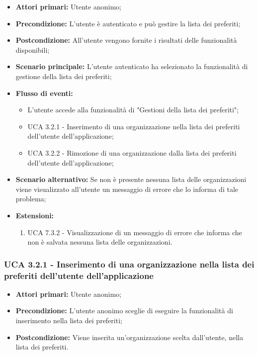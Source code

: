 \begin{itemize}
	\item \textbf{Attori primari:} Utente anonimo;
	\item \textbf{Precondizione:} L'utente è autenticato e può gestire la lista dei preferiti;
	\item \textbf{Postcondizione:} All'utente vengono fornite i risultati delle funzionalità disponibili;
	\item \textbf{Scenario principale:} L'utente autenticato ha selezionato la funzionalità di gestione della lista dei preferiti;
	\item \textbf{Flusso di eventi:}
			\begin{itemize}
			\item L'utente accede alla funzionalità di "Gestioni della lista dei preferiti";
			\item UCA 3.2.1 - Inserimento di una organizzazione nella lista dei preferiti dell'utente dell'applicazione;
			\item UCA 3.2.2 - Rimozione di una organizzazione dalla lista dei preferiti dell'utente dell'applicazione;
			\end{itemize}
	\item \textbf{Scenario alternativo:} Se non è presente nessuna lista delle organizzazioni viene visualizzato all'utente un messaggio di errore che lo informa di tale problema;
	\item \textbf{Estensioni:}
	\begin{enumerate}
		\item UCA 7.3.2 - Visualizzazione di un messaggio di errore che informa che non è salvata nessuna lista delle organizzazioni.
	\end{enumerate}
\end{itemize}

\subsubsection{UCA 3.2.1 - Inserimento di una organizzazione nella lista dei preferiti dell'utente dell'applicazione}%
\begin{itemize}
	\item \textbf{Attori primari:} Utente anonimo;
	\item \textbf{Precondizione:} L'utente anonimo sceglie di eseguire la funzionalità di inserimento nella lista dei preferiti; 
	\item \textbf{Postcondizione:} Viene inserita un'organizzazione scelta dall'utente, nella lista dei preferiti.
\end{itemize}

